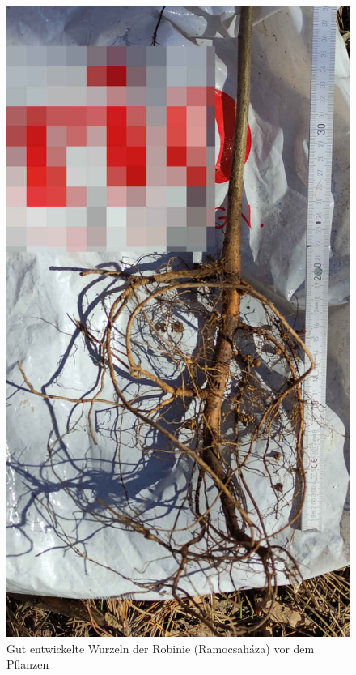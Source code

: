 \documentclass[twocolumn]{scrartcl}
\begin{document}
\begin{figure}[htbp]
  \centering
  \includegraphics[width=.9\linewidth]{./bild/wurzelRobinie}
  \caption{Gut entwickelte Wurzeln der Robinie (Ramocsaháza) vor dem Pflanzen}
  \label{fig:wurzelRobinie}
\end{figure}
\end{document}
